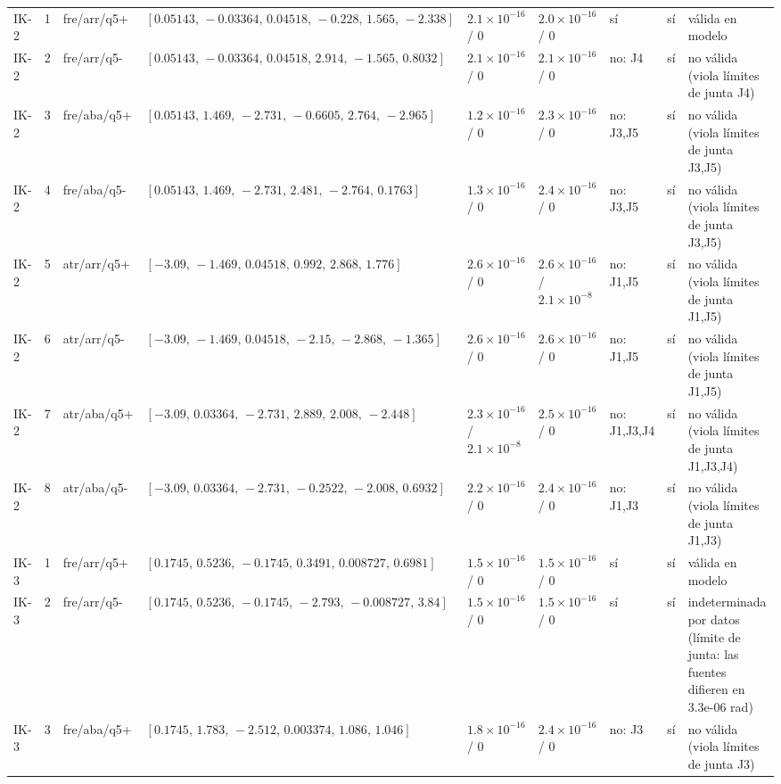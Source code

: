 \begin{longtable}{lcllllllp{5.2cm}}
IK-2 & 1 & fre/arr/q5+ & $[0.05143,\,-0.03364,\,0.04518,\,-0.228,\,1.565,\,-2.338]$ & $2.1\times10^{-16}$ / $0$ & $2.0\times10^{-16}$ / $0$ & s\'i & sí & v\'alida en modelo \\
IK-2 & 2 & fre/arr/q5- & $[0.05143,\,-0.03364,\,0.04518,\,2.914,\,-1.565,\,0.8032]$ & $2.1\times10^{-16}$ / $0$ & $2.1\times10^{-16}$ / $0$ & no: J4 & sí & no v\'alida (viola l\'imites de junta J4) \\
IK-2 & 3 & fre/aba/q5+ & $[0.05143,\,1.469,\,-2.731,\,-0.6605,\,2.764,\,-2.965]$ & $1.2\times10^{-16}$ / $0$ & $2.3\times10^{-16}$ / $0$ & no: J3,J5 & sí & no v\'alida (viola l\'imites de junta J3,J5) \\
IK-2 & 4 & fre/aba/q5- & $[0.05143,\,1.469,\,-2.731,\,2.481,\,-2.764,\,0.1763]$ & $1.3\times10^{-16}$ / $0$ & $2.4\times10^{-16}$ / $0$ & no: J3,J5 & sí & no v\'alida (viola l\'imites de junta J3,J5) \\
IK-2 & 5 & atr/arr/q5+ & $[-3.09,\,-1.469,\,0.04518,\,0.992,\,2.868,\,1.776]$ & $2.6\times10^{-16}$ / $0$ & $2.6\times10^{-16}$ / $2.1\times10^{-8}$ & no: J1,J5 & sí & no v\'alida (viola l\'imites de junta J1,J5) \\
IK-2 & 6 & atr/arr/q5- & $[-3.09,\,-1.469,\,0.04518,\,-2.15,\,-2.868,\,-1.365]$ & $2.6\times10^{-16}$ / $0$ & $2.6\times10^{-16}$ / $0$ & no: J1,J5 & sí & no v\'alida (viola l\'imites de junta J1,J5) \\
IK-2 & 7 & atr/aba/q5+ & $[-3.09,\,0.03364,\,-2.731,\,2.889,\,2.008,\,-2.448]$ & $2.3\times10^{-16}$ / $2.1\times10^{-8}$ & $2.5\times10^{-16}$ / $0$ & no: J1,J3,J4 & sí & no v\'alida (viola l\'imites de junta J1,J3,J4) \\
IK-2 & 8 & atr/aba/q5- & $[-3.09,\,0.03364,\,-2.731,\,-0.2522,\,-2.008,\,0.6932]$ & $2.2\times10^{-16}$ / $0$ & $2.4\times10^{-16}$ / $0$ & no: J1,J3 & sí & no v\'alida (viola l\'imites de junta J1,J3) \\
IK-3 & 1 & fre/arr/q5+ & $[0.1745,\,0.5236,\,-0.1745,\,0.3491,\,0.008727,\,0.6981]$ & $1.5\times10^{-16}$ / $0$ & $1.5\times10^{-16}$ / $0$ & s\'i & sí & v\'alida en modelo \\
IK-3 & 2 & fre/arr/q5- & $[0.1745,\,0.5236,\,-0.1745,\,-2.793,\,-0.008727,\,3.84]$ & $1.5\times10^{-16}$ / $0$ & $1.5\times10^{-16}$ / $0$ & s\'i & sí & indeterminada por datos (l\'imite de junta: las fuentes difieren en 3.3e-06 rad) \\
IK-3 & 3 & fre/aba/q5+ & $[0.1745,\,1.783,\,-2.512,\,0.003374,\,1.086,\,1.046]$ & $1.8\times10^{-16}$ / $0$ & $2.4\times10^{-16}$ / $0$ & no: J3 & sí & no v\'alida (viola l\'imites de junta J3) \\

\end{longtable}
